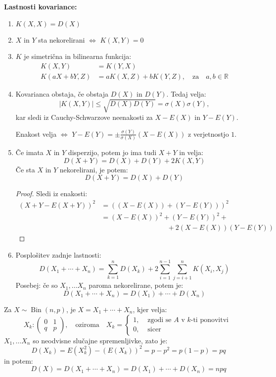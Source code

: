 \documentclass[12pt]{book}
\def\n{\noindent}
\theoremstyle{definition}
\theoremstyle{plain}
\theoremstyle{plain}
\theoremstyle{plain}
\theoremstyle{remark}
\begin{document}
\n \textbf{Lastnosti kovariance:}

\begin{enumerate}
    \item $K(X,X) = D(X)$
    \item $X$ in $Y$ sta nekorelirani $\iff$ $K(X,Y) = 0$
    \item $K$ je simetrična in bilinearna funkcija:
    $$
    \begin{aligned}
        K(X, Y)&=K(Y, X)  \\
        K(a X+b Y, Z)&=a K(X, Z)+b K(Y, Z), \quad \text{za} \quad a, b \in \mathbb{R}  
    \end{aligned}
    $$
    \item Kovarianca obstaja, če obstaja $D(X)$ in $D(Y)$. Tedaj velja:
    $$
    |K(X, Y)| \leq \sqrt{D(X) D(Y)}=\sigma(X) \sigma(Y),
    $$
    kar sledi iz Cauchy-Schwarzove neenakosti za $X-E(X)$ in $Y-E(Y)$. 
    
    Enakost velja $\iff$ $Y-E(Y)= \pm \frac{\sigma(Y)}{\sigma(X)} (X-E(X))$ z verjetnostjo $1$. 
    \item Če imata $X$ in $Y$ disperzijo, potem jo ima tudi $X+Y$ in velja: 
    $$
    D(X+Y)=D(X)+D(Y)+2 K(X, Y)
    $$
    Če sta $X$ in $Y$ nekorelirani, je potem: 
    $$
    D(X+Y)=D(X)+D(Y)
    $$ 
    \begin{proof}
        Sledi iz enakosti: 
        $$
        \begin{aligned}
            (X+Y-E(X+Y))^2&=\left((X-E(X))+(Y-E(Y))\right)^2 \\
            &= (X-E(X))^2+(Y-E(Y))^2 +\\
            &\hspace{4cm} +2(X-E(X)) (Y-E(Y))
        \end{aligned}
        $$
    \end{proof}
    \item Posplošitev zadnje lastnosti: 
    $$
    D\left(X_1+\cdots+X_n\right)=\sum_{k=1}^n D\left(X_k\right)+2 \sum_{i=1}^{n-1} \sum_{j=i+1}^n K\left(X_i, X_j\right)
    $$
    Posebej: če so $X_1, \ldots X_n$ paroma nekorelirane, potem je: 
    $$
    D\left(X_1+\cdots+X_n\right)=D\left(X_1\right)+\cdots+D\left(X_n\right)
    $$
\end{enumerate}

\begin{zgled}
    Za $X \sim \operatorname{Bin}(n,p)$, je $X=X_1+\cdots+X_n$, kjer velja:
    $$
    X_k:\left(\begin{array}{cc} 0 & 1 \\ q & p \end{array}\right), \quad \text{oziroma} \quad X_k= \begin{cases}1, & \text { zgodi se $A$ v $k$-ti ponovitvi } \\ 0, & \text { sicer }\end{cases} 
    $$
    $X_1, \ldots X_n$ so neodvisne slučajne spremenljivke, zato je: 
    $$
    D\left(X_k\right)=E\left(X_k^2\right)-\left(E\left(X_k\right)\right)^2=p-p^2=p(1-p)=p q
    $$
    in potem: 
    $$
    D(X)=D\left(X_1+\cdots+X_n\right)=D\left(X_1\right)+\cdots+D\left(X_n\right)=n p q
    $$
\end{zgled}
\end{document}
